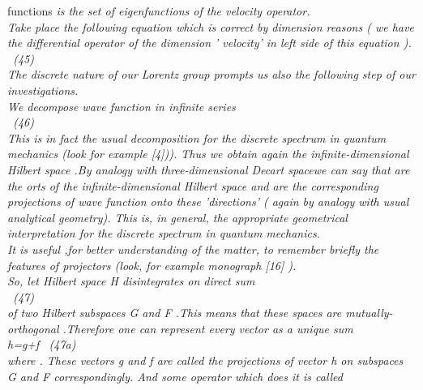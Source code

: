 \documentclass[a4paper,12pt] {article}
\begin{document}
{ functions  \myHighlight{$  \tilde \Psi $}\coordHE{}  \it  is the set  of  eigenfunctions of the velocity operator.
\\ \rm Take place the following equation which is correct by dimension reasons ( we have the
 \it differential operator of  the dimension ' velocity' in left side of this equation \rm ).
\\\coordHE{} \  (45)
 \\ The discrete nature of our Lorentz group prompts us also the following  step of our investigations.
\\ We  decompose wave  function  \myHighlight{$\tilde \Psi  $}\coordHE{}  in  \it  infinite series
 \\\coordHE{} \rm \ (46) \\ This is in fact the usual decomposition for the
discrete spectrum in quantum mechanics (look for example [4])). Thus we obtain again the
\it infinite-dimensional Hilbert  space .\rm  By analogy with  \it  three-dimensional Decart  space\rm  we
can say that  \coordHE{}  are the \it orts \rm of the infinite-dimensional   Hilbert  space and
 \coordHE{}  are the
 corresponding  \it projections \rm of wave function \myHighlight{$ \tilde \Psi $}\coordHE{} onto these 'directions' ( again by
analogy with usual analytical geometry). This is, in general,  the appropriate geometrical interpretation
 for the discrete spectrum in quantum mechanics.\\ It is useful ,for  better understanding of the matter, to
 remember briefly the features of projectors (look, for example monograph [16] ). \\
So, let Hilbert space H disintegrates on direct sum  \\\coordHE{}  \ (47) \\ of two Hilbert
subspaces G and F  .This means that these spaces are   mutually-orthogonal .Therefore one can represent
 \it  every vector  \coordHE{}  as a \it unique sum \rm
 \\ h=g+f  \ (47a)
\\where  {}\coordHE{} . These vectors g and f are called the \it projections of vector \rm  h
 \it  on subspaces \rm  G  \it and \rm  F    correspondingly. And some operator which does  it is called
}
\end{document}
